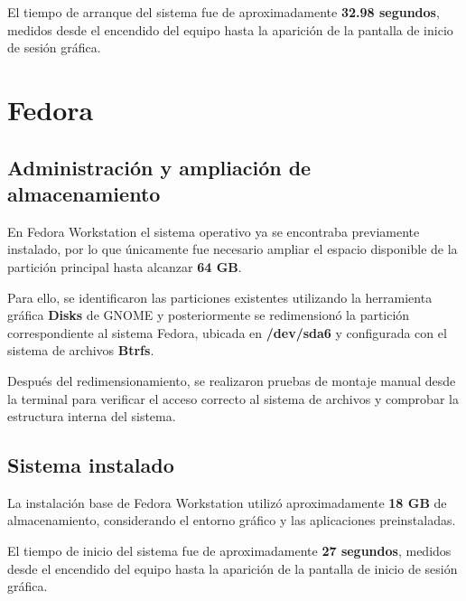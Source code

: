 \documentclass[11pt, letterpaper]{article}
\begin{document}
El tiempo de arranque del sistema fue de aproximadamente \textbf{32.98 segundos}, medidos desde el encendido del equipo hasta la aparición de la pantalla de inicio de sesión gráfica.

\section{Fedora}
\label{sec:orga68a3e5}

\subsection{Administración y ampliación de almacenamiento}

En Fedora Workstation el sistema operativo ya se encontraba previamente instalado, por lo que únicamente fue necesario ampliar el espacio disponible de la partición principal hasta alcanzar \textbf{64 GB}.

Para ello, se identificaron las particiones existentes utilizando la herramienta gráfica \textbf{Disks} de GNOME y posteriormente se redimensionó la partición correspondiente al sistema Fedora, ubicada en \textbf{/dev/sda6} y configurada con el sistema de archivos \textbf{Btrfs}.

Después del redimensionamiento, se realizaron pruebas de montaje manual desde la terminal para verificar el acceso correcto al sistema de archivos y comprobar la estructura interna del sistema.

\subsection{Sistema instalado}

La instalación base de Fedora Workstation utilizó aproximadamente \textbf{18 GB} de almacenamiento, considerando el entorno gráfico y las aplicaciones preinstaladas.

El tiempo de inicio del sistema fue de aproximadamente \textbf{27 segundos}, medidos desde el encendido del equipo hasta la aparición de la pantalla de inicio de sesión gráfica.
\end{document}
